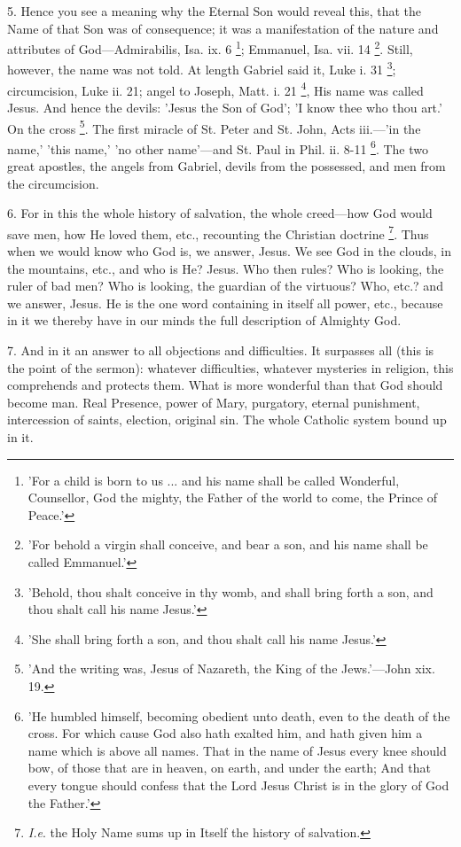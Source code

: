 5. Hence you see a meaning why the Eternal Son
would reveal this, that the Name of that Son was of consequence; it
was a manifestation of the nature and attributes of God—Admirabilis,
Isa. ix. 6 \footnote{'For a child is born to
us ... and his name shall be called Wonderful, Counsellor, God the
mighty, the Father of the world to come, the Prince of Peace.'}; Emmanuel,
Isa. vii. 14 \footnote{'For behold a virgin
shall conceive, and bear a son, and his name shall be called
Emmanuel.'}. Still,
however, the name was not told. At length Gabriel said it, Luke i. 31
\footnote{'Behold, thou shalt
conceive in thy womb, and shall bring forth a son, and thou shalt call
his name Jesus.'}; circumcision, Luke
ii. 21; angel to Joseph, Matt. i. 21 \footnote{'She shall bring forth a
son, and thou shalt call his name Jesus.'}, His name was called Jesus. And hence the devils: 'Jesus the
Son of God'; 'I know thee who thou art.' On the cross \footnote{'And the writing was,
Jesus of Nazareth, the King of the Jews.'—John xix. 19.}. The first miracle of St. Peter and St. John, Acts iii.—'in
the name,' 'this name,' 'no other name'—and St. Paul in Phil. ii.
8-11 \footnote{'He humbled himself,
becoming obedient unto death, even to the death of the cross. For
which cause God also hath exalted him, and hath given him a name which
is above all names. That in the name of Jesus every knee should bow,
of those that are in heaven, on earth, and under the earth; And that
every tongue should confess that the Lord Jesus Christ is in the glory
of God the Father.'}. The two great
apostles, the angels from Gabriel, devils from the possessed, and
men from the circumcision.

6. For in this the whole history of salvation,
the whole creed—how God would save men, how He loved them, etc.,
recounting the Christian doctrine \footnote{\emph{I.e}. the Holy
Name sums up in Itself the history of salvation.}. Thus when we would know who God is, we answer, Jesus. We see
God in the clouds, in the mountains, etc., and who is He? Jesus. Who
then rules? Who is looking, the ruler of bad men? Who is looking, the
guardian of the virtuous? Who, etc.? and we answer, Jesus. He is the
one word containing in itself all power, etc., because in it we
thereby have in our minds the full description of Almighty God.

7. And in it an answer to all objections and
difficulties. It surpasses all (this is the point of the sermon):
whatever difficulties, whatever mysteries in religion, this
comprehends and protects them. What is more wonderful than that God
should become man. Real Presence, power of Mary, purgatory, eternal
punishment, intercession of saints, election, original sin. The whole
Catholic system bound up in it.

